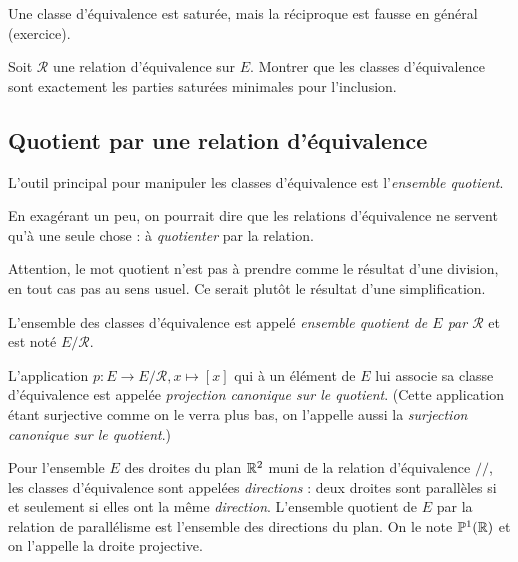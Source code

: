 \begin{exemple}
Une classe d'équivalence est saturée, mais la réciproque est fausse en général (exercice).
\end{exemple}

\begin{exercice}
Soit $\mathcal R$ une relation d'équivalence sur $E$. Montrer que les classes d'équivalence sont exactement les parties saturées minimales pour l'inclusion.
\end{exercice}


\subsection{Quotient par une relation d'équivalence}

\begin{mdframed}[linewidth=2]
L'outil principal pour manipuler les classes d'équivalence est l'\emph{ensemble quotient}. 

En exagérant un peu, on pourrait dire que les relations d'équivalence ne servent qu'à une seule chose : à \emph{quotienter} par la relation.

Attention, le mot \og quotient\fg{} n'est pas à prendre comme le résultat d'une \og division\fg, en tout cas pas au sens usuel. Ce serait plutôt le résultat d'une \og simplification\fg.
\end{mdframed}

\begin{definition}

L'ensemble des classes d'équivalence est appelé \emph{ensemble quotient de $E$ par $\mathcal R$} et est noté $E/{\mathcal R}$.

L'application $p : E \to E/\mathcal R, x\mapsto [x]$ qui à un élément de $E$ lui associe sa classe d'équivalence est appelée  \emph{projection canonique sur le quotient}. (Cette application étant surjective comme on le verra plus bas, on l'appelle aussi la \emph{surjection canonique sur le quotient}.)
\end{definition}

\begin{exemple}
Pour l'ensemble $E$ des droites du plan $\mathbb{R}^2$ muni de la relation d'équivalence $//$, les classes d'équivalence sont appelées \emph{directions} : deux droites sont parallèles si et seulement si elles ont la même \emph{direction}. L'ensemble quotient de $E$ par la relation de parallélisme est l'ensemble des directions du plan. On le note $\mathbb{P}^1(\mathbb{R})$ et on l'appelle la droite projective.
\end{exemple}

